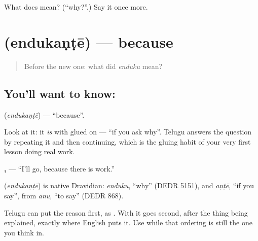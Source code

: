 \begin{tcolorbox}[breakable,colback=teal!4,colframe=teal!35!black,title={Before you move on}]
What does  mean? (\textquotedblleft{}why?\textquotedblright{}.) Say it once more.
\end{tcolorbox}
\section[\texorpdfstring{\te{ఎందుకంటే} (endukaṇṭē)}{ఎందుకంటే (endukaṇṭē)}]{ (endukaṇṭē) — because}

\label{lesson:TE-C74-because}



\begin{quote}
Before the new one: what did \emph{enduku} mean?
\end{quote}

\subsection*{You'll want to know: }
\textbf{} (\emph{endukaṇṭē}) — \textquotedblleft{}because\textquotedblright{}.

Look at it: it \emph{is}  with \textbf{} glued on — \textquotedblleft{}if you ask why\textquotedblright{}. Telugu answers the question by repeating it and then continuing, which is the gluing habit of your very first lesson doing real work.

\textbf{ ,   } — \textquotedblleft{}I'll go, because there is work.\textquotedblright{}

\begin{cousinweb}
\textbf{} (\emph{endukaṇṭē}) is native Dravidian: \emph{enduku}, \textquotedblleft{}why\textquotedblright{} (DEDR 5151), and \emph{aṇṭē}, \textquotedblleft{}if you say\textquotedblright{}, from \emph{anu}, \textquotedblleft{}to say\textquotedblright{} (DEDR 868).
\end{cousinweb}

\begin{grammarlens}[title={Grammar Lens: the reason clause comes second}]
Telugu can put the reason first, as \textbf{    }. With  it goes second, after the thing being explained, exactly where English puts it. Use  while that ordering is still the one you think in.
\end{grammarlens}

